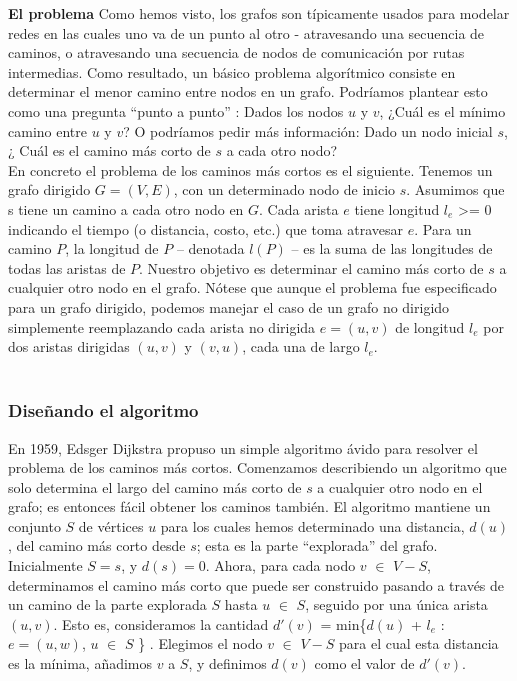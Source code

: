 \documentclass[a4paper, 12pt]{book}
\theoremstyle{dotless}
\begin{document}
\textbf{El problema}
Como hemos visto, los grafos son típicamente usados para modelar redes en las cuales uno va de un punto al otro -  atravesando una secuencia de caminos, o atravesando una secuencia de nodos de comunicación por rutas intermedias. Como resultado, un básico problema algorítmico consiste en determinar el menor camino entre nodos en un grafo. Podríamos plantear esto como una pregunta ``punto a punto'' : Dados los nodos $u$ y $v$, ¿Cuál es el mínimo camino entre $u$ y $v$? O podríamos pedir más información: Dado un nodo inicial $s$, ¿ Cuál es el camino más corto de $s$ a cada otro nodo?\\

En concreto el problema de los caminos más cortos es el siguiente. Tenemos un grafo dirigido $G=(V,E)$, con un determinado nodo de inicio $s$. Asumimos que s tiene un camino a cada otro nodo en $G$. Cada arista $e$ tiene longitud $l_e$ >=  0 indicando el tiempo (o distancia, costo, etc.) que toma atravesar $e$. Para un camino $P$, la longitud de $P$ – denotada $l(P)$ – es la suma de las longitudes de todas las aristas de $P$. Nuestro objetivo es determinar el camino más corto de $s$ a cualquier otro nodo en el grafo. Nótese que aunque el problema fue especificado para un grafo dirigido, podemos manejar el caso de un grafo no dirigido simplemente reemplazando cada arista no dirigida $e=(u,v)$ de longitud $l_e$ por dos aristas dirigidas $(u,v)$ y $(v,u)$, cada una de largo $l_e$.\\\\

\subsubsection*{Diseñando el algoritmo}
En 1959, Edsger Dijkstra propuso un simple algoritmo ávido para resolver el problema de los caminos más cortos. Comenzamos describiendo un algoritmo que solo determina el largo del camino más corto de $s$ a cualquier otro nodo en el grafo; es entonces fácil obtener los caminos también. El algoritmo mantiene un conjunto $S$ de vértices $u$ para los cuales hemos determinado una distancia, $d(u)$, del camino más corto desde $s$; esta es la parte ``explorada'' del grafo. Inicialmente $S={s}$, y $d(s)=0$. Ahora, para cada nodo $v$ \(\in\) $V-S$, determinamos el camino más corto que puede ser construido pasando a través de un camino de la parte explorada $S$ hasta $u$ \(\in\) $S$, seguido por una única arista $(u,v)$. Esto es, consideramos la cantidad $d'(v)$ = min\{$d (u)$ + $l_e$ : $e=(u,w)$, $u$ \(\in\) $S$ \} . Elegimos el nodo $v$ \(\in\) $V-S$ para el cual esta distancia es la mínima, añadimos $v$ a $S$, y definimos $d(v)$ como el valor de $d'(v)$.\\
\end{document}
